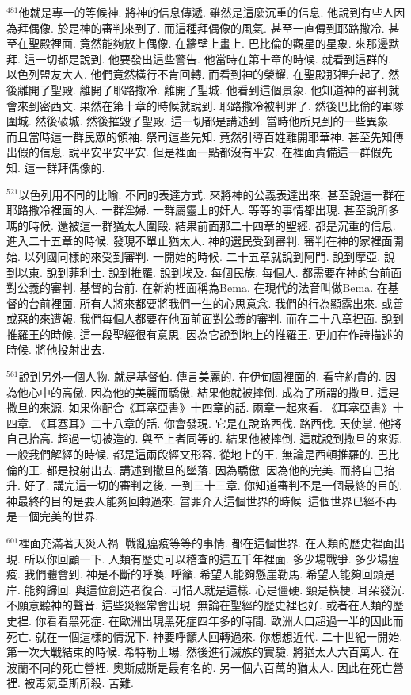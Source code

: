 \documentclass{book}
\begin{document}
$^{481}$他就是專一的等候神.
將神的信息傳遞.
雖然是這麼沉重的信息.
他說到有些人因為拜偶像.
於是神的審判來到了.
而這種拜偶像的風氣.
甚至一直傳到耶路撒冷.
甚至在聖殿裡面.
竟然能夠放上偶像.
在牆壁上畫上.
巴比倫的觀星的星象.
來那邊默拜.
這一切都是說到.
他要發出這些警告.
他當時在第十章的時候.
就看到這群的.
以色列盟友大人.
他們竟然橫行不肯回轉.
而看到神的榮耀.
在聖殿那裡升起了.
然後離開了聖殿.
離開了耶路撒冷.
離開了聖城.
他看到這個景象.
他知道神的審判就會來到密西文.
果然在第十章的時候就說到.
耶路撒冷被判罪了.
然後巴比倫的軍隊圍城.
然後破城.
然後摧毀了聖殿.
這一切都是講述到.
當時他所見到的一些異象.
而且當時這一群民眾的領袖.
祭司這些先知.
竟然引導百姓離開耶華神.
甚至先知傳出假的信息.
說平安平安平安.
但是裡面一點都沒有平安.
在裡面責備這一群假先知.
這一群拜偶像的.

$^{521}$以色列用不同的比喻.
不同的表達方式.
來將神的公義表達出來.
甚至說這一群在耶路撒冷裡面的人.
一群淫婦.
一群屬靈上的奸人.
等等的事情都出現.
甚至說所多瑪的時候.
還被這一群猶太人圍毆.
結果前面那二十四章的聖經.
都是沉重的信息.
進入二十五章的時候.
發現不單止猶太人.
神的選民受到審判.
審判在神的家裡面開始.
以列國同樣的來受到審判.
一開始的時候.
二十五章就說到阿門.
說到摩亞.
說到以東.
說到菲利士.
說到推羅.
說到埃及.
每個民族.
每個人.
都需要在神的台前面對公義的審判.
基督的台前.
在新約裡面稱為Bema.
在現代的法音叫做Bema.
在基督的台前裡面.
所有人將來都要將我們一生的心思意念.
我們的行為顯露出來.
或善或惡的來遭報.
我們每個人都要在他面前面對公義的審判.
而在二十八章裡面.
說到推羅王的時候.
這一段聖經很有意思.
因為它說到地上的推羅王.
更加在作詩描述的時候.
將他投射出去.

$^{561}$說到另外一個人物.
就是基督伯.
傳言美麗的.
在伊甸園裡面的.
看守約貴的.
因為他心中的高傲.
因為他的美麗而驕傲.
結果他就被摔倒.
成為了所謂的撒旦.
這是撒旦的來源.
如果你配合《耳塞亞書》十四章的話.
兩章一起來看.
《耳塞亞書》十四章.
《耳塞耳》二十八章的話.
你會發現.
它是在說路西伐.
路西伐.
天使掌.
他將自己抬高.
超過一切被造的.
與至上者同等的.
結果他被摔倒.
這就說到撒旦的來源.
一般我們解經的時候.
都是這兩段經文形容.
從地上的王.
無論是西頓推羅的.
巴比倫的王.
都是投射出去.
講述到撒旦的墜落.
因為驕傲.
因為他的完美.
而將自己抬升.
好了.
講完這一切的審判之後.
一到三十三章.
你知道審判不是一個最終的目的.
神最終的目的是要人能夠回轉過來.
當罪介入這個世界的時候.
這個世界已經不再是一個完美的世界.

$^{601}$裡面充滿著天災人禍.
戰亂瘟疫等等的事情.
都在這個世界.
在人類的歷史裡面出現.
所以你回顧一下.
人類有歷史可以稽查的這五千年裡面.
多少場戰爭.
多少場瘟疫.
我們體會到.
神是不斷的呼喚.
呼籲.
希望人能夠懸崖勒馬.
希望人能夠回頭是岸.
能夠歸回.
與這位創造者復合.
可惜人就是這樣.
心是僵硬.
頸是橫梗.
耳朵發沉.
不願意聽神的聲音.
這些災經常會出現.
無論在聖經的歷史裡也好.
或者在人類的歷史裡.
你看看黑死症.
在歐洲出現黑死症四年多的時間.
歐洲人口超過一半的因此而死亡.
就在一個這樣的情況下.
神要呼籲人回轉過來.
你想想近代.
二十世紀一開始.
第一次大戰結束的時候.
希特勒上場.
然後進行滅族的實驗.
將猶太人六百萬人.
在波蘭不同的死亡營裡.
奧斯威斯是最有名的.
另一個六百萬的猶太人.
因此在死亡營裡.
被毒氣亞斯所殺.
苦難.
\end{document}
